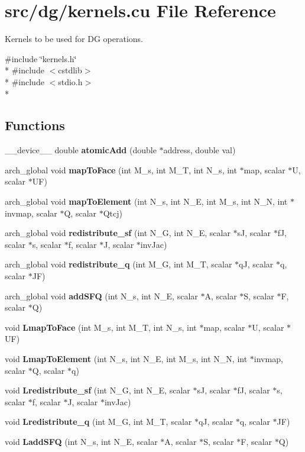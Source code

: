 \section{src/dg/kernels.cu File Reference}
\label{kernels_8cu}


Kernels to be used for D\-G operations.  


{\ttfamily \#include \char`\"{}kernels.\-h\char`\"{}}\\*
{\ttfamily \#include $<$cstdlib$>$}\\*
{\ttfamily \#include $<$stdio.\-h$>$}\\*
\subsection*{Functions}
\begin{DoxyCompactItemize}
\item 
\-\_\-\-\_\-device\-\_\-\-\_\- double {\bf atomic\-Add} (double $\ast$address, double val)
\item 
arch\-\_\-global void {\bf map\-To\-Face} (int M\-\_\-s, int M\-\_\-\-T, int N\-\_\-s, int $\ast$map, scalar $\ast$U, scalar $\ast$U\-F)
\item 
arch\-\_\-global void {\bf map\-To\-Element} (int N\-\_\-s, int N\-\_\-\-E, int M\-\_\-s, int N\-\_\-\-N, int $\ast$invmap, scalar $\ast$Q, scalar $\ast$Qtcj)
\item 
arch\-\_\-global void {\bf redistribute\-\_\-sf} (int N\-\_\-\-G, int N\-\_\-\-E, scalar $\ast$s\-J, scalar $\ast$f\-J, scalar $\ast$s, scalar $\ast$f, scalar $\ast$J, scalar $\ast$inv\-Jac)
\item 
arch\-\_\-global void {\bf redistribute\-\_\-q} (int M\-\_\-\-G, int M\-\_\-\-T, scalar $\ast$q\-J, scalar $\ast$q, scalar $\ast$J\-F)
\item 
arch\-\_\-global void {\bf add\-S\-F\-Q} (int N\-\_\-s, int N\-\_\-\-E, scalar $\ast$A, scalar $\ast$S, scalar $\ast$F, scalar $\ast$Q)
\item 
void {\bf Lmap\-To\-Face} (int M\-\_\-s, int M\-\_\-\-T, int N\-\_\-s, int $\ast$map, scalar $\ast$U, scalar $\ast$U\-F)
\item 
void {\bf Lmap\-To\-Element} (int N\-\_\-s, int N\-\_\-\-E, int M\-\_\-s, int N\-\_\-\-N, int $\ast$invmap, scalar $\ast$Q, scalar $\ast$q)
\item 
void {\bf Lredistribute\-\_\-sf} (int N\-\_\-\-G, int N\-\_\-\-E, scalar $\ast$s\-J, scalar $\ast$f\-J, scalar $\ast$s, scalar $\ast$f, scalar $\ast$J, scalar $\ast$inv\-Jac)
\item 
void {\bf Lredistribute\-\_\-q} (int M\-\_\-\-G, int M\-\_\-\-T, scalar $\ast$q\-J, scalar $\ast$q, scalar $\ast$J\-F)
\item 
void {\bf Ladd\-S\-F\-Q} (int N\-\_\-s, int N\-\_\-\-E, scalar $\ast$A, scalar $\ast$S, scalar $\ast$F, scalar $\ast$Q)
\end{DoxyCompactItemize}


